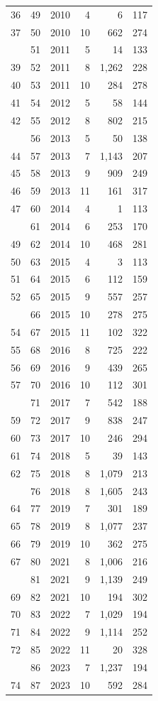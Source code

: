 \documentclass[
]{article}
\begin{document}
\begin{longtable}[t]{lrlrrr}
36 & 49 & 2010 & 4 & 6 & 117\\
37 & 50 & 2010 & 10 & 662 & 274\\
\addlinespace
38 & 51 & 2011 & 5 & 14 & 133\\
39 & 52 & 2011 & 8 & 1,262 & 228\\
40 & 53 & 2011 & 10 & 284 & 278\\
41 & 54 & 2012 & 5 & 58 & 144\\
42 & 55 & 2012 & 8 & 802 & 215\\
\addlinespace
43 & 56 & 2013 & 5 & 50 & 138\\
44 & 57 & 2013 & 7 & 1,143 & 207\\
45 & 58 & 2013 & 9 & 909 & 249\\
46 & 59 & 2013 & 11 & 161 & 317\\
47 & 60 & 2014 & 4 & 1 & 113\\
\addlinespace
48 & 61 & 2014 & 6 & 253 & 170\\
49 & 62 & 2014 & 10 & 468 & 281\\
50 & 63 & 2015 & 4 & 3 & 113\\
51 & 64 & 2015 & 6 & 112 & 159\\
52 & 65 & 2015 & 9 & 557 & 257\\
\addlinespace
53 & 66 & 2015 & 10 & 278 & 275\\
54 & 67 & 2015 & 11 & 102 & 322\\
55 & 68 & 2016 & 8 & 725 & 222\\
56 & 69 & 2016 & 9 & 439 & 265\\
57 & 70 & 2016 & 10 & 112 & 301\\
\addlinespace
58 & 71 & 2017 & 7 & 542 & 188\\
59 & 72 & 2017 & 9 & 838 & 247\\
60 & 73 & 2017 & 10 & 246 & 294\\
61 & 74 & 2018 & 5 & 39 & 143\\
62 & 75 & 2018 & 8 & 1,079 & 213\\
\addlinespace
63 & 76 & 2018 & 8 & 1,605 & 243\\
64 & 77 & 2019 & 7 & 301 & 189\\
65 & 78 & 2019 & 8 & 1,077 & 237\\
66 & 79 & 2019 & 10 & 362 & 275\\
67 & 80 & 2021 & 8 & 1,006 & 216\\
\addlinespace
68 & 81 & 2021 & 9 & 1,139 & 249\\
69 & 82 & 2021 & 10 & 194 & 302\\
70 & 83 & 2022 & 7 & 1,029 & 194\\
71 & 84 & 2022 & 9 & 1,114 & 252\\
72 & 85 & 2022 & 11 & 20 & 328\\
\addlinespace
73 & 86 & 2023 & 7 & 1,237 & 194\\
74 & 87 & 2023 & 10 & 592 & 284\\
\bottomrule
\end{longtable}
\end{document}
